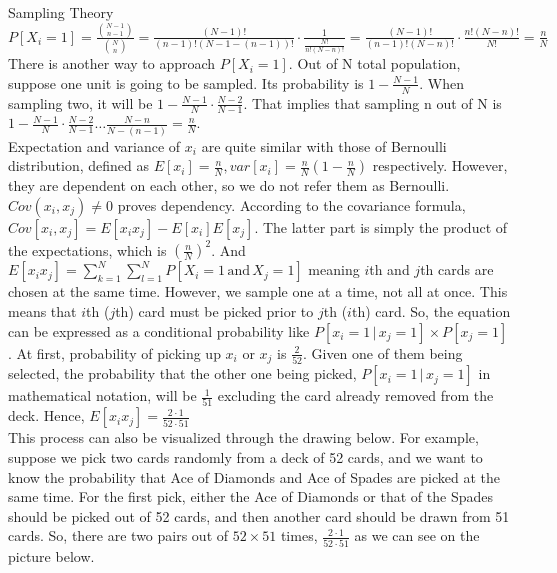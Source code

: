 \documentclass[12pt]{article}
\begin{document}
\begin{section}{Sampling Theory}
$P[X_i=1] = \frac{\binom{N-1}{n-1}}{\binom{N}{n}} = \frac{(N-1)!}{(n-1)!(N-1-(n-1))!} \cdot \frac{1}{\frac{N!}{n!(N-n)!}} = \frac{(N-1)!}{(n-1)!(N-n)!} \cdot \frac{n!(N-n)!}{N!} = \frac{n}{N}$ \\

There is another way to approach $P[X_i = 1]$. Out of N total population, suppose one unit is going to be sampled. Its probability is $1-\frac{N-1}{N}$. When sampling two, it will be $1-\frac{N-1}{N} \cdot \frac{N-2}{N-1}$. That implies that sampling n out of N is $1-\frac{N-1}{N} \cdot \frac{N-2}{N-1} \ldots \frac{N-n}{N-(n-1)} = \frac{n}{N}$. \\ 

Expectation and variance of $x_i$ are quite similar with those of Bernoulli distribution, defined as $E[x_i]=\frac{n}{N}, var[x_i]=\frac{n}{N} (1- \frac{n}{N})$ respectively. However, they are dependent on each other, so we do not refer them as Bernoulli. \\

$Cov(x_i,x_j) \neq 0$ proves dependency. According to the covariance formula, \\
$Cov[x_i,x_j] = E[x_ix_j]-E[x_i]E[x_j]$. The latter part is simply the product of the expectations, which is $(\frac{n}{N})^2$. And $E[x_ix_j] = \sum\limits_{k=1}^N \sum\limits_{l=1}^N P[X_i=1 \, \text{and} \, X_j=1]$ meaning $i$th and $j$th cards are chosen at the same time. However, we sample one at a time, not all at once. This means that $i$th ($j$th) card must be picked prior to $j$th ($i$th) card. So, the equation can be expressed as a conditional probability like $P[x_i=1 \, | \, x_j=1] \times P[x_j=1]$. At first, probability of picking up $x_i$ or $x_j$ is $\frac{2}{52}$. Given one of them being selected, the probability that the other one being picked, $P[x_i = 1 \, | \, x_j=1]$ in mathematical notation, will be $\frac{1}{51}$ excluding the card already removed from the deck. Hence, $E[x_ix_j] = \frac{2 \cdot 1}{52 \cdot 51}$ \\ 

This process can also be visualized through the drawing below. For example, suppose we pick two cards randomly from a deck of 52 cards, and we want to know the probability that Ace of Diamonds and Ace of Spades are picked at the same time. For the first pick, either the Ace of Diamonds or that of the Spades should be picked out of 52 cards, and then another card should be drawn from 51 cards. So, there are two pairs out of $52 \times 51$ times, $\frac{2 \cdot 1}{52 \cdot 51}$ as we can see on the picture below.


\end{section}
\end{document}
